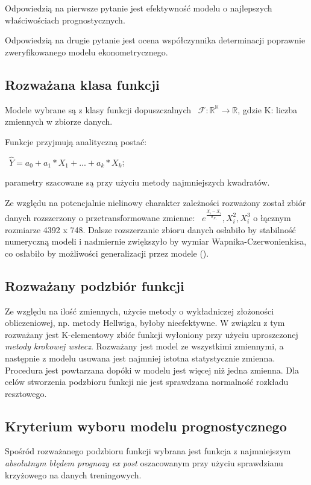 \documentclass{article}
\begin{document}
Odpowiedzią na pierwsze pytanie jest efektywność modelu o najlepszych właściwościach prognostycznych.

Odpowiedzią na drugie pytanie jest ocena współczynnika determinacji poprawnie zweryfikowanego modelu ekonometrycznego.

\subsection{Rozważana klasa funkcji}
Modele wybrane są z klasy funkcji dopuszczalnych ~$\mathscr{F}: \mathbb{R^K\to R}$,
gdzie K: liczba zmiennych w zbiorze danych.

Funkcje przyjmują analityczną postać:

~$\hat{Y}=a_0+a_1*X_1+...+a_k*X_k$;

parametry szacowane są przy użyciu metody najmniejszych kwadratów.

Ze względu na potencjalnie nielinowy charakter zależności rozważony został zbiór danych rozszerzony o przetransformowane zmienne: ~$e^{\frac{X_i-\overline{X_i}}{\sigma_{X_i}}}, X_i^2, X_i^3$ o łącznym rozmiarze 4392 x 748. Dalsze rozszerzanie zbioru danych osłabiło by stabilność numeryczną modeli i nadmiernie zwiększyło by wymiar Wapnika-Czerwonienkisa, co osłabiło by możliwości generalizacji przez modele (\textcite{Kaminski2017}).

\newpage
\subsection{Rozważany podzbiór funkcji}
Ze względu na ilość zmiennych, użycie metody o wykładniczej złożoności obliczeniowej, np. metody Hellwiga, byłoby nieefektywne. W związku z tym rozważany jest K-elementowy zbiór funkcji wyłoniony przy użyciu uproszczonej \textit{metody krokowej wstecz}. Rozważany jest model ze wszystkimi zmiennymi, a następnie z modelu usuwana jest najmniej istotna statystycznie zmienna. Procedura jest powtarzana dopóki w modelu jest więcej niż jedna zmienna. Dla celów stworzenia podzbioru funkcji nie jest sprawdzana normalność rozkładu resztowego.

\subsection{Kryterium wyboru modelu prognostycznego}
Spośród rozważanego podzbioru funkcji wybrana jest funkcja z najmniejszym \textit{absolutnym błędem prognozy ex post} oszacowanym przy użyciu sprawdzianu krzyżowego na danych treningowych.
\end{document}
